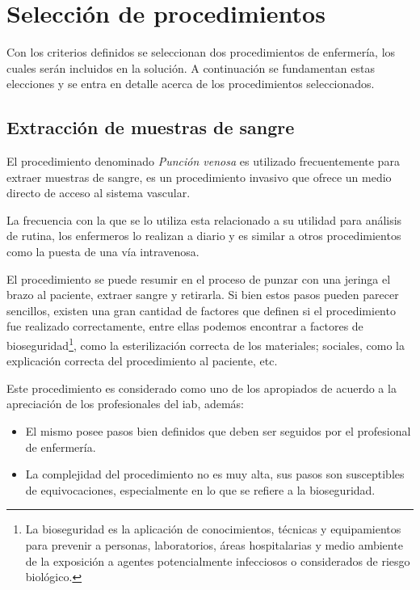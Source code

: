 \section{Selección de procedimientos}
\label{sec:seleccion_escenas}

Con los criterios definidos se seleccionan dos procedimientos
de enfermería, los cuales serán incluidos en la solución. A continuación se
fundamentan estas elecciones y se entra en detalle acerca de los
procedimientos seleccionados.


\subsection{Extracción de muestras de sangre}
\label{sec:hemocultivo}

El procedimiento denominado \emph{Punción venosa} es utilizado frecuentemente
para extraer muestras de sangre, es un procedimiento invasivo que ofrece un
medio directo de acceso al sistema vascular. 

La frecuencia con la que se lo utiliza esta relacionado a su utilidad para
análisis de rutina, los enfermeros lo realizan a diario y es similar a otros
procedimientos como la puesta de una vía intravenosa.

El procedimiento se puede resumir en el proceso de punzar con una jeringa el
brazo al paciente, extraer sangre y retirarla. Si bien estos pasos pueden
parecer sencillos, existen una gran cantidad de factores que definen si el
procedimiento fue realizado correctamente, entre ellas podemos encontrar a
factores de bioseguridad\footnote{La bioseguridad es la aplicación de
    conocimientos, técnicas y equipamientos para prevenir a personas,
    laboratorios, áreas hospitalarias y medio ambiente de la exposición a
    agentes potencialmente infecciosos o considerados de riesgo biológico.},
como la esterilización correcta de los materiales; sociales, como la explicación
correcta del procedimiento al paciente, etc.

Este procedimiento es considerado como uno de los apropiados de acuerdo a la
apreciación de los profesionales del \Gls{iab}, además: 

\begin{itemize}
\item El mismo posee pasos bien definidos que deben ser seguidos por el
    profesional de enfermería.
\item La complejidad del procedimiento no es muy alta, sus pasos son
    susceptibles de equivocaciones, especialmente en lo que se refiere a la
    bioseguridad. 
\end{itemize}



